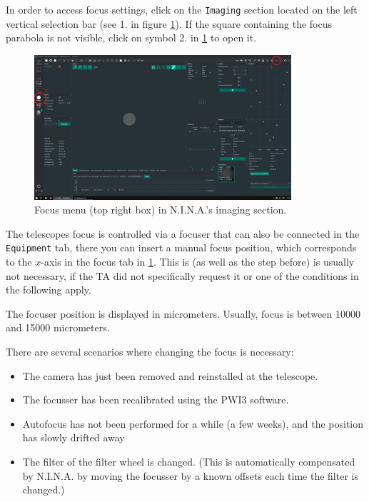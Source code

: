 \documentclass[a4paper, 11pt, fleqn]{memoir}
\begin{document}
In order to access focus settings, click on the \texttt{Imaging} section located on the left vertical selection bar (see 1. in figure \ref{fig:NINA:focusing_tab}). If the square containing the focus parabola is not visible, click on symbol 2. in \ref{fig:NINA:focusing_tab} to open it. 

\begin{figure}
    \centering
    \includegraphics[width=0.85\textwidth]{figures/NINA/focusing_tab.png}
    \caption{Focus menu (top right box) in N.I.N.A.'s imaging section.}
    \label{fig:NINA:focusing_tab}
\end{figure} %

The telescopes focus is controlled via a focuser that can also be connected in the \texttt{Equipment} tab, there you can insert a manual focus position, which corresponds to the $x$-axis in the focus tab in \ref{fig:NINA:focusing_tab}. This is (as well as the step before) is usually not necessary, if the TA did not specifically request it or one of the conditions in the following apply. 

The focuser position is displayed in micrometers.
Usually, focus is between 10000 and 15000 micrometers.

There are several scenarios where changing the focus is necessary:
\begin{itemize}
    \item The camera has just been removed and reinstalled at the telescope.
    \item
          The focusser has been recalibrated using the PWI3 software.
    \item
          Autofocus has not been performed for a while (a few weeks), and the position has slowly drifted away
    \item
          The filter of the filter wheel is changed. (This is automatically compensated by N.I.N.A. by moving the focusser by a known offsets each time the filter is changed.)
\end{itemize}
\end{document}
